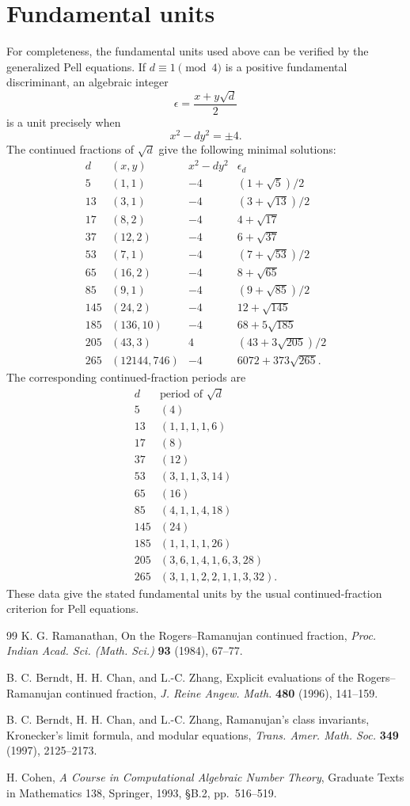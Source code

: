 \documentclass[11pt,a4paper]{article}
\begin{document}
\appendix
\section{Fundamental units}
For completeness, the fundamental units used above can be verified by the generalized Pell equations.  If $d\equiv1\pmod4$ is a positive fundamental discriminant, an algebraic integer
\[
\epsilon=\frac{x+y\sqrt d}{2}
\]
is a unit precisely when
\[
x^2-dy^2=\pm4.
\]
The continued fractions of $\sqrt d$ give the following minimal solutions:
\[
\begin{array}{c|c|c|c}
d&(x,y)&x^2-dy^2&\epsilon_d\\ \hline
5&(1,1)&-4&(1+\sqrt5)/2\\
13&(3,1)&-4&(3+\sqrt{13})/2\\
17&(8,2)&-4&4+\sqrt{17}\\
37&(12,2)&-4&6+\sqrt{37}\\
53&(7,1)&-4&(7+\sqrt{53})/2\\
65&(16,2)&-4&8+\sqrt{65}\\
85&(9,1)&-4&(9+\sqrt{85})/2\\
145&(24,2)&-4&12+\sqrt{145}\\
185&(136,10)&-4&68+5\sqrt{185}\\
205&(43,3)&4&(43+3\sqrt{205})/2\\
265&(12144,746)&-4&6072+373\sqrt{265}.
\end{array}
\]
The corresponding continued-fraction periods are
\[
\begin{array}{c|l}
d&\text{period of }\sqrt d\\ \hline
5&(4)\\
13&(1,1,1,1,6)\\
17&(8)\\
37&(12)\\
53&(3,1,1,3,14)\\
65&(16)\\
85&(4,1,1,4,18)\\
145&(24)\\
185&(1,1,1,1,26)\\
205&(3,6,1,4,1,6,3,28)\\
265&(3,1,1,2,2,1,1,3,32).
\end{array}
\]
These data give the stated fundamental units by the usual continued-fraction criterion for Pell equations.

\begin{thebibliography}{99}
K. G. Ramanathan,
On the Rogers--Ramanujan continued fraction,
\emph{Proc. Indian Acad. Sci. (Math. Sci.)} \textbf{93} (1984), 67--77.

B. C. Berndt, H. H. Chan, and L.-C. Zhang,
Explicit evaluations of the Rogers--Ramanujan continued fraction,
\emph{J. Reine Angew. Math.} \textbf{480} (1996), 141--159.

B. C. Berndt, H. H. Chan, and L.-C. Zhang,
Ramanujan's class invariants, Kronecker's limit formula, and modular equations,
\emph{Trans. Amer. Math. Soc.} \textbf{349} (1997), 2125--2173.

H. Cohen,
\emph{A Course in Computational Algebraic Number Theory},
Graduate Texts in Mathematics 138, Springer, 1993, \S B.2, pp.~516--519.
\end{thebibliography}
\end{document}
